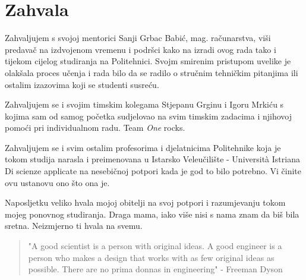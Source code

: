 \chapter*{Zahvala}
Zahvaljujem s svojoj mentorici Sanji Grbac Babić, mag. računarstva, viši predavač na izdvojenom vremenu i podršci kako na izradi ovog rada tako i tijekom cijelog studiranja na Politehnici.
Svojm smirenim pristupom uvelike je olakšala proces učenja i rada bilo da se radilo o stručnim tehničkim pitanjima ili ostalim izazovima koji se studenti susreću.

Zahvaljujem se i svojim timskim kolegama Stjepanu Grginu i Igoru Mrkiću s kojima sam od samog početka sudjelovao na svim timskim zadacima i njihovoj pomoći pri individualnom radu. 
Team \textit{One} rocks.

Zahvaljujem se i svim ostalim profesorima i djelatnicima Politehnike koja je tokom studija narasla i preimenovana u Istarsko Veleučilište - Universit\`{a} Istriana Di scienze applicate na nesebičnoj potpori kada je god to bilo potrebno.
Vi činite ovu ustanovu ono što ona je.

Naposljetku veliko hvala mojoj obitelji na svoj potpori i razumjevanju tokom mojeg ponovnog studiranja.
Draga mama, iako više nisi s nama znam da biš bila sretna.
Neizmjerno ti hvala na svemu.

\vspace*{2cm}

\begin{quotation}
"A good scientist is a person with original ideas. A good engineer is a person who makes a design that works with as few original ideas as possible. There are no prima donnas in engineering" - Freeman Dyson
\end{quotation}